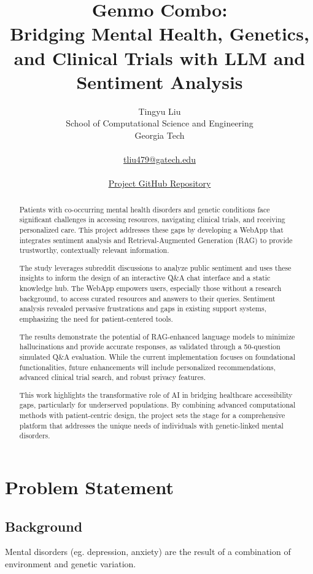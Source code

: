\documentclass{article} %
\title{Genmo Combo:\\
Bridging Mental Health, Genetics, and Clinical Trials with LLM and Sentiment Analysis
}
\author{Tingyu Liu\\ School of Computational Science and Engineering\\Georgia Tech\\ \\  \url{tliu479@gatech.edu} \\ \\ \href{https://github.com/taraliu23/Turmerik-MLE-Takehome}{Project GitHub Repository}}
\begin{document}
\maketitle

\begin{abstract}
Patients with co-occurring mental health disorders and genetic conditions face significant challenges in accessing resources, navigating clinical trials, and receiving personalized care. This project addresses these gaps by developing a WebApp that integrates sentiment analysis and Retrieval-Augmented Generation (RAG) to provide trustworthy, contextually relevant information.

The study leverages subreddit discussions to analyze public sentiment and uses these insights to inform the design of an interactive Q&A chat interface and a static knowledge hub. The WebApp empowers users, especially those without a research background, to access curated resources and answers to their queries. Sentiment analysis revealed pervasive frustrations and gaps in existing support systems, emphasizing the need for patient-centered tools.

The results demonstrate the potential of RAG-enhanced language models to minimize hallucinations and provide accurate responses, as validated through a 50-question simulated Q&A evaluation. While the current implementation focuses on foundational functionalities, future enhancements will include personalized recommendations, advanced clinical trial search, and robust privacy features.

This work highlights the transformative role of AI in bridging healthcare accessibility gaps, particularly for underserved populations. By combining advanced computational methods with patient-centric design, the project sets the stage for a comprehensive platform that addresses the unique needs of individuals with genetic-linked mental disorders.

\end{abstract}

\section{Problem Statement}

\subsection{Background}

Mental disorders (eg. depression, anxiety) are the result of a combination of environment and genetic variation.
\end{document}
